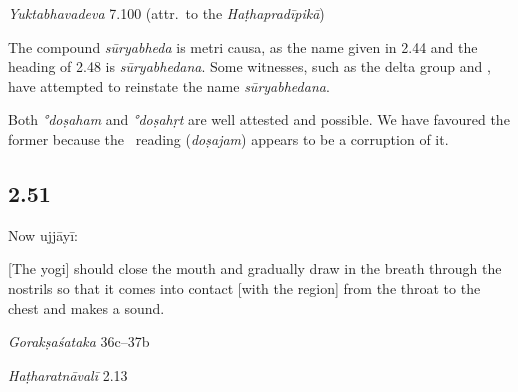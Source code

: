 \begin{ekdosis}
\begin{testimonia}[hp02_050]
\emph{Yuktabhavadeva} 7.100 (attr.~to the \emph{Haṭhapradīpikā})

\begin{versinnote}
\end{versinnote}

\end{testimonia}

\begin{philcomm}[hp02_050]
The compound \emph{sūryabheda} is metri causa, as the name given in 2.44 and the heading of 2.48 is \emph{sūryabhedana}. Some witnesses, such as the delta group and , have attempted to reinstate the name \emph{sūryabhedana}.

Both \emph{°doṣaham} and \emph{°doṣahṛt} are well attested and possible. We have favoured the former because the \textalpha\ reading (\emph{doṣajam}) appears to be a corruption of it.
\end{philcomm}

\subsection*{2.51}
\begin{translation}[hp02_051]
Now ujjāyī:

[The yogi] should close the mouth and gradually draw in the breath through the nostrils so that it comes into contact [with the region] from the throat to the chest and makes a sound.\end{translation}

\begin{sources}[hp02_051]
\emph{Gorakṣaśataka} 36c–37b

\begin{versinnote}
\tl{\var{kaṇṭhāt tu] kaṇṭhaṃ tu T}\\!}
\end{versinnote}
\end{sources}

\begin{testimonia}[hp02_051]
\emph{Haṭharatnāvalī} 2.13
\begin{versinnote}
\tl{\var{hṛtkaṇṭhaṃ ] hṛtkaṇṭhe N, n1, n4, J} \\!}%
\end{versinnote}


\end{testimonia}
\end{ekdosis}
